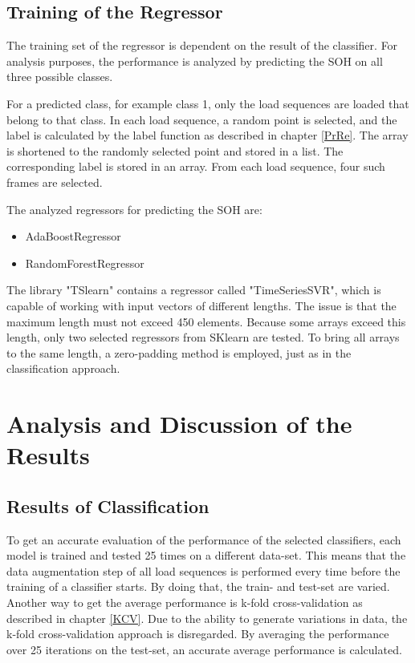 \subsection{Training of the Regressor}
The training set of the regressor is dependent on the result of the classifier. For analysis purposes, the performance is analyzed by predicting the SOH on all three possible classes. 

For a predicted class, for example class 1, only the load sequences are loaded that belong to that class. In each load sequence, a random point is selected, and the label is calculated by the label function as described in chapter \ref{PrRe}. The array is shortened to the randomly selected point and stored in a list. The corresponding label is stored in an array. From each load sequence, four such frames are selected.

The analyzed regressors for predicting the SOH are:
\begin{itemize} 
	\itemsep-0.5em 
	\item AdaBoostRegressor \cite{tslearn}
	\item RandomForestRegressor \cite{tslearn}
\end{itemize}

The library "TSlearn" \cite{tslearn} contains a regressor called "TimeSeriesSVR", which is capable of working with input vectors of different lengths. The issue is that the maximum length must not exceed 450 elements. Because some arrays exceed this length, only two selected regressors from SKlearn \cite{SKlearn} are tested. To bring all arrays to the same length, a zero-padding method is employed, just as in the classification approach.

\section{Analysis and Discussion of the Results}
\subsection{Results of Classification}
To get an accurate evaluation of the performance of the selected classifiers, each model is trained and tested 25 times on a different data-set. This means that the data augmentation step of all load sequences is performed every time before the training of a classifier starts.
By doing that, the train- and test-set are varied. Another way to get the average performance is k-fold cross-validation as described in chapter \ref{KCV}. Due to the ability to generate variations in data, the k-fold cross-validation approach is disregarded. By averaging the performance over 25 iterations on the test-set, an accurate average performance is calculated. 

